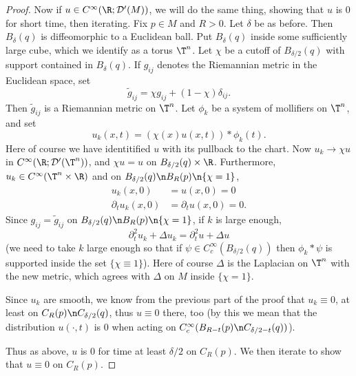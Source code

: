\documentclass[12pt]{article}
\begin{document}
\begin{proof}
Now if $u \in C^\infty(\R;\mathcal D'(M))$, we will do the same thing, showing that $u$ is $0$ for short time, then iterating. Fix $p\in M$ and $R > 0$. Let $\delta$ be as before. Then $B_{\delta}(q)$ is diffeomorphic to a Euclidean ball. Put $B_{\delta}(q)$ inside some sufficiently large cube, which we identify as a torus $\T^n$. Let $\chi$ be a cutoff of $B_{\delta/2}(q)$ with support contained in $B_{\delta}(q)$. If $g_{ij}$ denotes the Riemannian metric in the Euclidean space, set
\[\tilde{g}_{ij} = \chi g_{ij} + (1-\chi)\delta_{ij}.\] Then $\tilde{g}_{ij}$ is a Riemannian metric on $\T^n$. Let $\phi_k$ be a system of mollifiers on $\T^n$, and set 
\[u_k(x,t) = (\chi(x)u(x,t))\ast\phi_k(t).\] Here of course we have identitified $u$ with its pullback to the chart. Now $u_k \to \chi u$ in $C^\infty(\R;\mathcal D'(\T^n))$, and $\chi u = u$ on $B_{\delta/2}(q)\times\R$. Furthermore, $u_k \in C^\infty(\T^n \times \R)$ and  on $B_{\delta/2}(q)\n B_R(p)\n\{\chi = 1\}$,
\begin{align*}u_k(x,0) &= u(x,0) = 0\\
\partial_t u_k(x,0) &= \partial_t u(x,0) = 0.\end{align*}
Since $g_{ij} = \tilde{g}_{ij}$ on $B_{\delta/2}(q) \n B_R(p) \n \{\chi = 1\}$, if $k$ is large enough,
\[\partial_t^2 u_k + \Delta u_k = \partial_t^2 u + \Delta u\]
(we need to take $k$ large enough so that if $\psi \in C_c^\infty(B_{\delta/2}(q))$ then $\phi_k\ast \psi$ is supported inside the set $\{\chi \equiv 1\}$). Here of course $\Delta$ is the Laplacian on $\T^n$ with the new metric, which agrees with $\Delta$ on $M$ inside $\{\chi = 1\}$.

Since $u_k$ are smooth, we know from the previous part of the proof that $u_k \equiv 0$, at least on $C_R(p)\n C_{\delta/2}(q)$, thus $u \equiv 0$ there, too (by this we mean that the distribution $u(\cdot, t)$ is $0$ when acting on $C_c^\infty(B_{R-t}(p)\n C_{\delta/2-t}(q))$).

Thus as above, $u$ is $0$ for time at least $\delta/2$ on $C_R(p)$. We then iterate to show that $u \equiv 0$ on $C_R(p)$.\end{proof}
\end{document}
